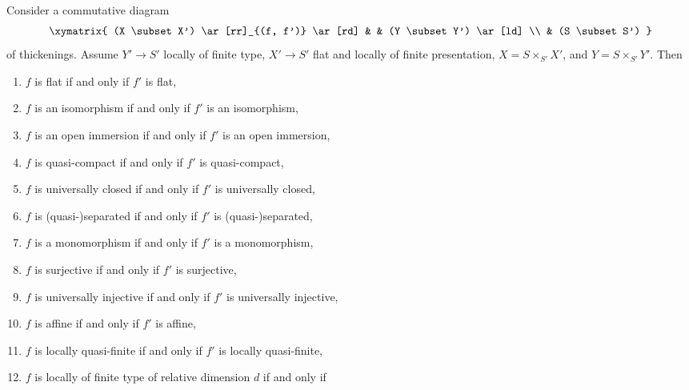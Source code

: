 %
\begin{lemma}
\label{lemma-deform-property-fp-over-ft}
Consider a commutative diagram
$$
\xymatrix{
(X \subset X') \ar[rr]_{(f, f')} \ar[rd] & & (Y \subset Y') \ar[ld] \\
& (S \subset S')
}
$$
of thickenings. Assume $Y' \to S'$ locally of finite type,
$X' \to S'$ flat and locally of finite presentation,
$X = S \times_{S'} X'$, and $Y = S \times_{S'} Y'$. Then
\begin{enumerate}
\item $f$ is flat if and only if $f'$ is flat,
\label{item-flat-fp-over-ft}
\item $f$ is an isomorphism if and only if $f'$ is an isomorphism,
\label{item-isomorphism-fp-over-ft}
\item $f$ is an open immersion if and only if $f'$ is an open immersion,
\label{item-open-immersion-fp-over-ft}
\item $f$ is quasi-compact if and only if $f'$ is quasi-compact,
\label{item-quasi-compact-fp-over-ft}
\item $f$ is universally closed if and only if $f'$ is universally closed,
\label{item-universally-closed-fp-over-ft}
\item $f$ is (quasi-)separated if and only if $f'$ is (quasi-)separated,
\label{item-separated-fp-over-ft}
\item $f$ is a monomorphism if and only if $f'$ is a monomorphism,
\label{item-monomorphism-fp-over-ft}
\item $f$ is surjective if and only if $f'$ is surjective,
\label{item-surjective-fp-over-ft}
\item $f$ is universally injective if and only if $f'$ is universally injective,
\label{item-universally-injective-fp-over-ft}
\item $f$ is affine if and only if $f'$ is affine,
\label{item-affine-fp-over-ft}
\item $f$ is locally quasi-finite if and only if $f'$ is locally quasi-finite,
\label{item-quasi-finite-fp-over-ft}
\item
\label{item-relative-dimension-d-fp-over-ft}
$f$ is locally of finite type of relative dimension $d$ if and only if

\end{enumerate}
\end{lemma}
